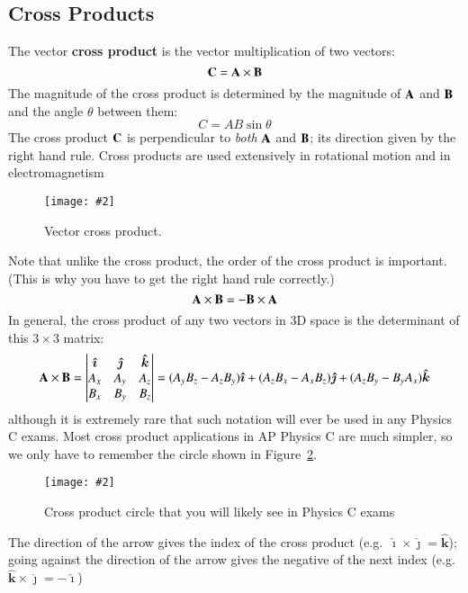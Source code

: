 \documentclass{../../oss-handout}
\newcommand{\mb}[1]{\ensuremath\mathbf{#1}}
\newcommand{\pic}[2]{\texttt{[image: \#2]}}
\begin{document}
\subsection{Cross Products}
The vector \textbf{cross product} is the vector multiplication of two vectors:
\begin{equation*}
  \mb{C}=\mb{A}\times\mb{B}
\end{equation*}
The magnitude of the cross product is determined by the magnitude of $\mb{A}$
and $\mb{B}$ and the angle $\theta$ between them:
\begin{equation*}
  C=AB\sin\theta
\end{equation*}
The cross product $\mb{C}$ is perpendicular to \emph{both} $\mb{A}$ and
$\mb{B}$; its direction given by the right hand rule. Cross products are used
extensively in rotational motion and in electromagnetism
\begin{figure}[ht]
  \centering
  \pic{.3}{cross-product.png}
  \caption{Vector cross product.}
  \label{fig:cross1}
\end{figure}
Note that unlike the cross product, the order of the cross product is
important. (This is why you have to get the right hand rule correctly.)
\begin{equation*}
  \mb{A}\times\mb{B}=-\mb{B}\times\mb{A}
\end{equation*}
In general, the cross product of any two vectors in 3D space is the determinant
of this $3\times 3$ matrix:
\begin{equation*}
  \mb{A}\times\mb{B}=
  \left|
  \begin{matrix}
    \bm{\hat{\imath}} & \bm{\hat{\jmath}} & \bm{\hat{k}}\\
    A_x & A_y & A_z\\
    B_x & B_y & B_z
  \end{matrix}
  \right|
  =(A_yB_z-A_zB_y)\bm{\hat{\imath}} +
  (A_zB_x-A_xB_z)\bm{\hat{\jmath}} +
  (A_zB_y-B_yA_x)\bm{\hat{k}}
\end{equation*}
although it is extremely rare that such notation will ever be used in any
Physics C exams. Most cross product applications in AP Physics C are much
simpler, so we only have to remember the circle shown in
Figure~\ref{fig:cross2}.
\begin{figure}[ht]
  \centering
  \pic{.12}{cross-product-circle.png}
  \caption{Cross product circle that you will likely see in Physics C exams}
  \label{fig:cross2}
\end{figure}

The direction of the arrow gives the index of the cross product (e.g.\
$\bm{\hat{\imath}}\times\bm{\hat{\jmath}}=\bm{\hat{k}}$); going against the
direction of the arrow gives the negative of the next index (e.g.\
$\bm{\hat{k}}\times\bm{\hat{\jmath}}=-\bm{\hat{\imath}}$)
\end{document}
